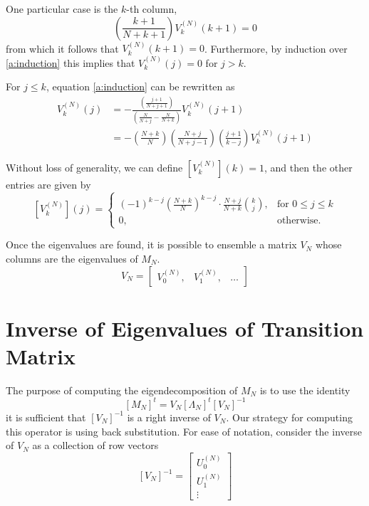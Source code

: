 \documentclass{article}
\newcommand{\ppar}[1]{\left( #1 \right)}
\newcommand{\spar}[1]{\left[ #1 \right]}
\begin{document}
One particular case is the $k$-th column,
\begin{equation}
    \ppar{\frac{k+1}{N+k+1}}V_k^{(N)}(k+1) = 0
\end{equation}
from which it follows that $V_k^{(N)}(k+1) = 0$. Furthermore, by induction over \eqref{a:induction} this implies that $V_k^{(N)}(j) = 0$ for $j>k$.

For $j\leq k$, equation \eqref{a:induction} can be rewritten as
\begin{align}
    V_k^{(N)}(j) 
    &= -
    \frac{\ppar{\frac{j+1}{N+j+1}}}{\ppar{\frac{N}{N+j}-\frac{N}{N+k} }}
    V_k^{(N)}(j+1)
    \nonumber \\
    &=
    -
    \ppar{\frac{N+k}{N}} \ppar{\frac{N+j}{N+j-1}} \ppar{\frac{j+1}{k-j}} V_k^{(N)}(j+1)
\end{align}

Without loss of generality, we can define $\spar{V_k^{(N)}}(k) = 1$, and then the other entries are given by
\begin{equation}
    \spar{V_k^{(N)}}(j) =
    \begin{cases}
    (-1)^{k-j} \ppar{\frac{N+k}{N}}^{k-j} \cdot \frac{N+j}{N+k} \binom{k}{j},
    &\text{for } 0 \leq j\leq k\\
    0, &\text{otherwise.}
    \end{cases}
\end{equation}

Once the eigenvalues are found, it is possible to ensemble a matrix $V_N$ whose columns are the eigenvalues of $M_N$.
\begin{equation}
    V_N = \begin{bmatrix}
        V_0^{(N)}, & V_1^{(N)}, & \dots
    \end{bmatrix}
\end{equation}

\section{Inverse of Eigenvalues of Transition Matrix}
\label{ap:inverse}

The purpose of computing the eigendecomposition of $M_N$ is to use the identity
\begin{equation}
    \spar{M_N}^t = V_N \spar{\Lambda_N}^t \spar{V_N}^{-1}
\end{equation}
it is sufficient that $\spar{V_N}^{-1}$ is a right inverse of $V_N$. 
%
Our strategy for computing this operator is using back substitution.
%
For ease of notation, consider the inverse of $V_N$ as a collection of row vectors
\begin{equation}
    \spar{V_N}^{-1} = \begin{bmatrix}
        U_0^{(N)} \\ U_1^{(N)} \\ \vdots
    \end{bmatrix}
\end{equation} 
\end{document}
